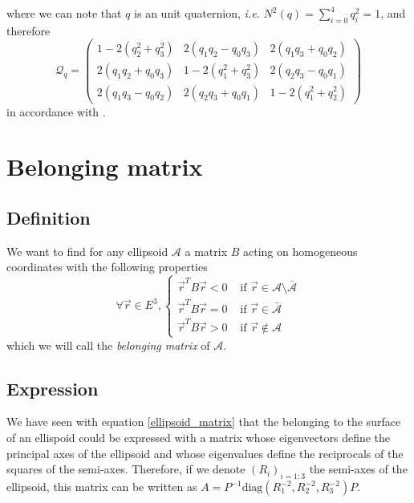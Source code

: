 \documentclass[class=report, float=false, crop=false]{standalone}
\begin{document}
where we can note that $q$ is an unit quaternion, \textit{i.e.} $N^2(q) = \sum_{i=0}^4 q_i^2 = 1$, and therefore
\begin{equation}
  \boxed{\mathcal{Q}_q =
    \begin{pmatrix}
      1 - 2 (q_2^2 + q_3^2) & 2 (q_1 q_2 - q_0 q_3) & 2 (q_1 q_3 + q_0 q_2) \\
      2 (q_1 q_2 + q_0 q_3) & 1 - 2 (q_1^2 + q_3^2) & 2 (q_2 q_3 - q_0 q_1) \\
      2 (q_1 q_3 - q_0 q_2) & 2 (q_2 q_3 + q_0 q_1) & 1 - 2 (q_1^2 + q_2^2)
    \end{pmatrix}
  }
\label{rotation_matrix_R3_expression}
\end{equation}
in accordance with \cite{wiki:quaternions}.

\section{Belonging matrix}

\subsection{Definition}

We want to find for any ellipsoid $\mathcal{A}$ a matrix $B$ acting on homogeneous coordinates with the following properties
\begin{equation}
\forall \vec{r} \in E^3, \begin{cases} \vec{r}^T B \vec{r} < 0 &\text{ if } \vec{r} \in \mathcal{A} \setminus \bar{\mathcal{A}} \\ \vec{r}^T B \vec{r} = 0 &\text{ if } \vec{r} \in \bar{\mathcal{A}} \\ \vec{r}^T B \vec{r} > 0 &\text{ if } \vec{r} \notin \mathcal{A} \end{cases}
\label{belonging_definition}
\end{equation}
which we will call the \textit{belonging matrix} of $\mathcal{A}$.

\subsection{Expression}
\label{belonging_exp}

We have seen with equation \ref{ellipsoid_matrix} that the belonging to the surface of an ellispoid could be expressed with a matrix whose eigenvectors define the principal axes of the ellipsoid and whose eigenvalues define the reciprocals of the squares of the semi-axes. Therefore, if we denote $(R_i)_{i=1:3}$ the semi-axes of the ellipsoid, this matrix can be written as $A = P^{-1}\text{diag}(R_1^{-2},R_2^{-2},R_3^{-2})P$.\\
\end{document}
